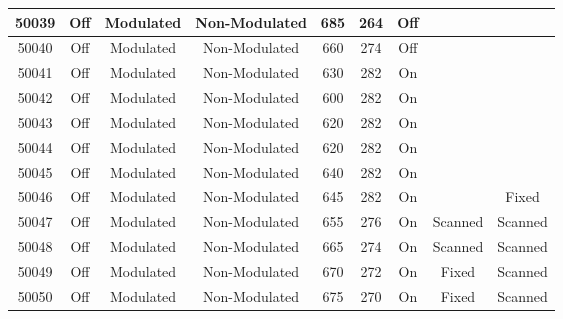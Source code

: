 \documentclass[preprint,12pt,authoryear]{elsarticle}
\begin{document}
\begin{center}
\begin{table}[!ht]
\begin{tabular}{|| c || c | c | c | c | c | c | c | c ||}
        \hline
        50039 & Off\cellcolor{MyBlue} & Modulated\cellcolor{Mygreen} & Non-Modulated\cellcolor{Myred} & 685 & 264 & Off\cellcolor{Myred} &  & \\
        \hline
        50040 & Off\cellcolor{MyBlue} & Modulated\cellcolor{Mygreen} & Non-Modulated\cellcolor{Myred} & 660 & 274 & Off\cellcolor{Myred} &  & \\
        \hline
        50041 & Off\cellcolor{MyBlue} & Modulated\cellcolor{Mygreen} & Non-Modulated\cellcolor{Myred} & 630 & 282 & On\cellcolor{Mygreen} &  & \\
        \hline
        50042 & Off\cellcolor{MyBlue} & Modulated\cellcolor{Mygreen} & Non-Modulated\cellcolor{Myred} & 600 & 282 & On\cellcolor{Mygreen} &  & \\
        \hline
        50043 & Off\cellcolor{MyBlue} & Modulated\cellcolor{Mygreen} & Non-Modulated\cellcolor{Myred} & 620 & 282 & On\cellcolor{Mygreen} &  & \\
        \hline
        50044 & Off\cellcolor{MyBlue} & Modulated\cellcolor{Mygreen} & Non-Modulated\cellcolor{Myred} & 620 & 282 & On\cellcolor{Mygreen} &  & \\
        \hline
        50045 & Off\cellcolor{MyBlue} & Modulated\cellcolor{Mygreen} & Non-Modulated\cellcolor{Myred} & 640 & 282 & On\cellcolor{Mygreen} &  & \\
        \hline
        50046 & Off\cellcolor{MyBlue} & Modulated\cellcolor{Mygreen} & Non-Modulated\cellcolor{Myred} & 645 & 282 & On\cellcolor{Mygreen} &  & Fixed\cellcolor{Myred}\\
        \hline
        50047 & Off\cellcolor{MyBlue} & Modulated\cellcolor{Mygreen} & Non-Modulated\cellcolor{Myred} & 655 & 276 & On\cellcolor{Mygreen} & Scanned\cellcolor{Mygreen} & Scanned\cellcolor{Mygreen}\\
        \hline
        50048 & Off\cellcolor{MyBlue} & Modulated\cellcolor{Mygreen} & Non-Modulated\cellcolor{Myred} & 665 & 274 & On\cellcolor{Mygreen} & Scanned\cellcolor{Mygreen} & Scanned\cellcolor{Mygreen}\\
        \hline
        50049 & Off\cellcolor{MyBlue} & Modulated\cellcolor{Mygreen} & Non-Modulated\cellcolor{Myred} & 670 & 272 & On\cellcolor{Mygreen} & Fixed\cellcolor{Myred} & Scanned\cellcolor{Mygreen}\\
        \hline
        50050 & Off\cellcolor{MyBlue} & Modulated\cellcolor{Mygreen} & Non-Modulated\cellcolor{Myred} & 675 & 270 & On\cellcolor{Mygreen} & Fixed\cellcolor{Myred} & Scanned\cellcolor{Mygreen}\\

\end{tabular}
\end{table}
\end{center}
\end{document}
